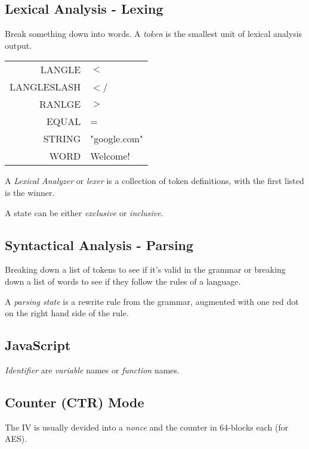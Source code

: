 \documentclass[12pt]{article}
\begin{document}
\subsection{Lexical Analysis - Lexing}

Break something down into words. A \emph{token} is the smallest unit of lexical analysis output.

\begin{tabular}{r | l}
	LANGLE & $<$ \\
	LANGLESLASH & $<$\slash \\
	RANLGE & $>$ \\
	EQUAL & = \\
	STRING & "google.com" \\
	WORD & Welcome!
\end{tabular}

A \emph{Lexical Analyzer} or \emph{lexer} is a collection of token definitions, with the first listed is the winner.



A state can be either \emph{exclusive} or \emph{inclusive}.



\subsection{Syntactical Analysis - Parsing}

Breaking down a list of tokens to see if it's valid in the grammar or breaking down a list of words to see if they follow the rules of a language.

A \emph{parsing state} is a rewrite rule from the grammar, augmented with one red dot on the right hand side of the rule.



\subsection{JavaScript}

\emph{Identifier} are \emph{variable} names or \emph{function} names.





\subsection*{Counter (CTR) Mode}

The IV is usually devided into a \emph{nonce} and the counter in 64-blocks each (for AES).
\end{document}
